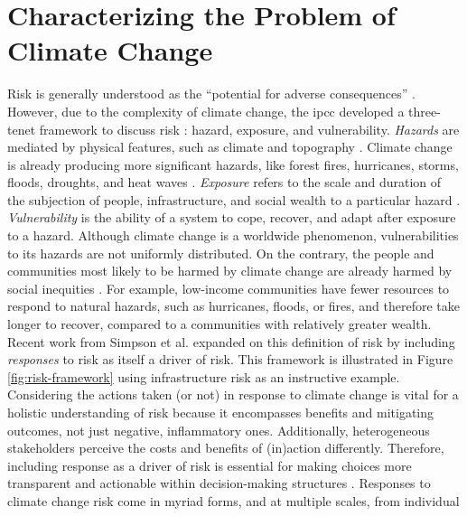 \section{Characterizing the Problem of Climate Change}
\label{section:climate-change-risk}

Risk is generally understood as the ``potential for adverse consequences''
\cite{reisinger_concept_2020}. However, due to the complexity of climate change,
the \ac{ipcc} developed a three-tenet framework to discuss risk
\cite{reisinger_concept_2020}: hazard, exposure, and vulnerability.
\textit{Hazards} are mediated by physical features, such as climate and
topography \cite{dorkenoo_critical_2022,simpson_framework_2021}.  Climate
change is already producing more significant hazards, like forest fires,
hurricanes, storms, floods, droughts, and heat waves
\cite{reidmiller_fourth_2018,intergovernmental_panel_on_climate_change_climate_2021,dahl_killer_2019}.
\textit{Exposure} refers to the scale and duration of the subjection of people,
infrastructure, and social wealth to a particular hazard
\cite{simpson_framework_2021,reisinger_concept_2020,li_understanding_2021}.
\textit{Vulnerability} is the ability of a system to cope, recover, and adapt
after exposure to a hazard. Although climate change is a worldwide phenomenon,
vulnerabilities to its hazards are not uniformly distributed. On the contrary,
the people and communities most likely to be harmed by climate change are
already harmed by social inequities \cite{islam_climate_2017}. For example, 
low-income communities have fewer resources to respond to natural hazards,
such as hurricanes, floods, or fires, and therefore take longer to recover, compared
to a communities with relatively greater wealth. Recent work from
Simpson et al. \cite{simpson_framework_2021} expanded on this definition of risk
by including \textit{responses} to risk as itself a driver of risk. This
framework is illustrated in Figure \ref{fig:risk-framework} using infrastructure
risk as an instructive example. Considering the actions taken (or not) in
response to climate change is vital for a holistic understanding of risk because
it encompasses benefits and mitigating outcomes, not just negative, inflammatory
ones. Additionally, heterogeneous stakeholders perceive the costs and benefits
of (in)action differently. Therefore, including response as a driver of risk is
essential for making choices more transparent and actionable within
decision-making structures \cite{simpson_framework_2021}. Responses to climate
change risk come in myriad forms,  and at multiple scales, from individual
